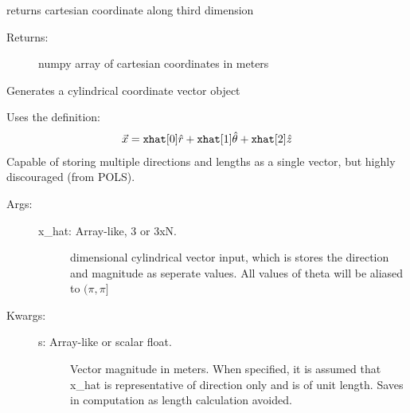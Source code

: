 \documentclass[letterpaper,10pt,english]{sphinxmanual}
\begin{document}
\begin{fulllineitems}
\begin{fulllineitems}
\label{TRIPPy:TRIPPy.geometry.Vec.x2}
returns cartesian coordinate along third dimension
\begin{description}
\item[{Returns:}] \leavevmode
numpy array of cartesian coordinates in meters

\end{description}

\end{fulllineitems}


\end{fulllineitems}


\begin{fulllineitems}
\label{TRIPPy:TRIPPy.geometry.Vecr}
Generates a cylindrical coordinate vector object

Uses the definition:
\begin{gather}
\begin{split}\vec{x}= \texttt{xhat}[0]\hat{r} + \texttt{xhat}[1]\hat{\theta} + \texttt{xhat}[2]\hat{z}\end{split}\notag
\end{gather}
Capable of storing multiple directions and lengths as a single
vector, but highly discouraged (from POLS).
\begin{description}
\item[{Args:}] \leavevmode\begin{description}
\item[{x\_hat: Array-like, 3 or 3xN.}]  dimensional cylindrical vector input, which is stores the 
direction and magnitude as seperate values.  All values of 
theta will be aliased to $(\pi,\pi]$

\end{description}

\item[{Kwargs:}] \leavevmode\begin{description}
\item[{s: Array-like or scalar float.}] \leavevmode
Vector magnitude in meters. When specified, it is assumed that 
x\_hat is representative of direction only and is of unit
length. Saves in computation as length calculation avoided.

\end{description}


\end{description}
\end{fulllineitems}
\end{document}
